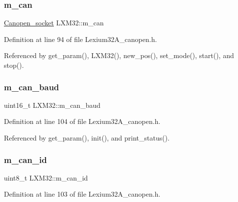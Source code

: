 \subsubsection{\texorpdfstring{m\+\_\+can}{m\_can}}
{\footnotesize\ttfamily \hyperlink{class_canopen__socket}{Canopen\+\_\+socket} L\+X\+M32\+::m\+\_\+can\hspace{0.3cm}{\ttfamily [private]}}



Definition at line 94 of file Lexium32\+A\+\_\+canopen.\+h.



Referenced by get\+\_\+param(), L\+X\+M32(), new\+\_\+pos(), set\+\_\+mode(), start(), and stop().

\mbox{\label{class_l_x_m32_adb622f21fcda644210c1479a0dbab4e3}} 
\subsubsection{\texorpdfstring{m\+\_\+can\+\_\+baud}{m\_can\_baud}}
{\footnotesize\ttfamily uint16\+\_\+t L\+X\+M32\+::m\+\_\+can\+\_\+baud\hspace{0.3cm}{\ttfamily [private]}}



Definition at line 104 of file Lexium32\+A\+\_\+canopen.\+h.



Referenced by get\+\_\+param(), init(), and print\+\_\+status().

\mbox{\label{class_l_x_m32_ab304270d7912f8e237ed6c36fa8c96c3}} 
\subsubsection{\texorpdfstring{m\+\_\+can\+\_\+id}{m\_can\_id}}
{\footnotesize\ttfamily uint8\+\_\+t L\+X\+M32\+::m\+\_\+can\+\_\+id\hspace{0.3cm}{\ttfamily [private]}}



Definition at line 103 of file Lexium32\+A\+\_\+canopen.\+h.



